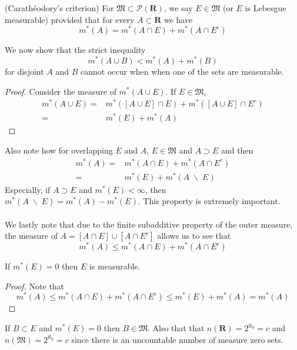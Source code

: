 \vspace{2ex}
\begin{defi}
(Carathéodory's criterion) For $\mathfrak{M}\subset \mathcal{P}({\bm R})$, we say $E\in \mathfrak{M}$ (or $E$ is Lebesgue measurable) provided that for every $A\subset {\bm R}$ we have
\[m^{*}(A)=m^{*}(A\cap E)+m^{*}(A\cap E^{c})\]
\end{defi}
\vspace{2ex}
\begin{rmk}
We now show that the strict inequality 
\[m^{*}(A\cup B)<m^{*}(A)+m^{*}(B)\]
for disjoint $A$ and $B$ cannot occur when when one of the sets are measurable.
\end{rmk}
\vspace{2ex}
\begin{proof}
Consider the measure of $m^{*}(A\cup E)$. If $E\in \mathfrak{M}$, 
\begin{align*}
	m^{*}(A\cup E)=&m^{*}([A\cup E]\cap E)+m^{*}([A\cup E]\cap E^{c})\\=& m^{*}(E)+m^{*}(A)
\end{align*}
\end{proof}
\vspace{2ex}
Also note how for overlapping $E$ and $A$, $E\in \mathfrak{M}$ and $A\supset E$ and then 
\begin{align*}
	m^{*}(A)=&m^{*}(A\cap E)+m^{*}(A\cap E^{c})\\=&m^{*}(E)+m^{*}(A\;\backslash\;E)
\end{align*}
Especially, if $A\supset E$ and $m^{*}(E)<\infty $, then $m^{*}(A\;\backslash\;E)=m^{*}(A)-m^{*}(E)$. This property is extremely important.
\\\\
We lastly note that due to the finite subadditive property of the outer measure, the measure of $A=[A\cap E]\cup [A\cap E^{c}]$ allows us to see that 
\[m^{*}(A)\leq m^{*}(A\cap E)+m^{*}(A\cap E^{c})\]
\begin{thm}
If $m^{*}(E)=0$ then $E$ is measurable. 
\end{thm}
\vspace{2ex}
\begin{proof}
Note that
\[m^{*}(A)\leq m^{*}(A\cap E)+m^{*}(A\cap E^{c})\leq m^{*}(E)+m^{*}(A)=m^{*}(A)\]
\end{proof}
\vspace{2ex}
\begin{cor}
If $B\subset E$ and $m^{*}(E)=0$ then $B\in \mathfrak{M}$. Also that that $n({\bm R})=2^{\aleph_{0}}=c$ and $n(\mathfrak{M})=2^{\aleph_{0}}=c$ since there is an uncountable number of measure zero sets.
\end{cor}
